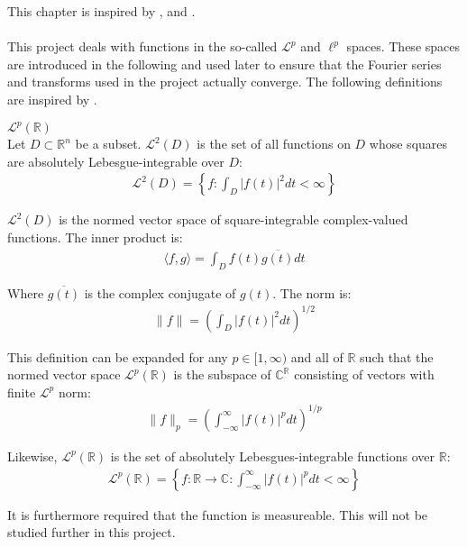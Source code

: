 This chapter is inspired by \cite{FAA}, \cite{FSP} and \cite{FTFA}.
\\ \\
This project deals with functions in the so-called $\mathcal{L}^p$ and $\ell^p$ spaces. These spaces are introduced in the following and used later to ensure that the Fourier series and transforms used in the project actually converge. The following definitions are inspired by \cite{page 31, FSP}.

\begin{definition}{$\mathcal{L}^p(\mathbb{R})$}
\\
Let $D \subset \mathbb{R}^n$ be a subset. $\mathcal{L}^2(D)$ is the set of all functions on $D$ whose squares are absolutely Lebesgue-integrable over $D$:
\begin{align*}
\mathcal{L}^2(D) = \left\{ f: \int_D |f(t)|^2 dt < \infty \right\}
\end{align*}

$\mathcal{L}^2(D)$ is the normed vector space of square-integrable complex-valued functions. The inner product is:
\begin{align*}
\langle f,g \rangle =  \int_D f(t) \overline{g(t)} dt
\end{align*}

Where $\overline{g(t)}$ is the complex conjugate of $g(t)$. The norm is:
\begin{align*}
\|f\| = \left( \int_D |f(t)|^2 dt \right)^{1/2}
\end{align*}

This definition can be expanded for any $p \in [1,\infty)$ and all of $\mathbb{R}$ such that the normed vector space $\mathcal{L}^p(\mathbb{R})$ is the subspace of $\mathbb{C}^\mathbb{R}$ consisting of vectors with finite $\mathcal{L}^p$ norm:
\begin{align*}
\|f\|_p = \left( \int_{-\infty}^\infty |f(t)|^p dt \right)^{1/p}
\end{align*}

Likewise, $\mathcal{L}^p(\mathbb{R})$ is the set of absolutely Lebesgues-integrable functions over $\mathbb{R}$:
\begin{align*}
\mathcal{L}^p(\mathbb{R}) = \left\{ f: \mathbb{R} \to \mathbb{C}: \int_{-\infty}^\infty |f(t)|^p dt < \infty \right\}
\end{align*}

It is furthermore required that the function is measureable. This will not be studied further in this project.
\end{definition}

